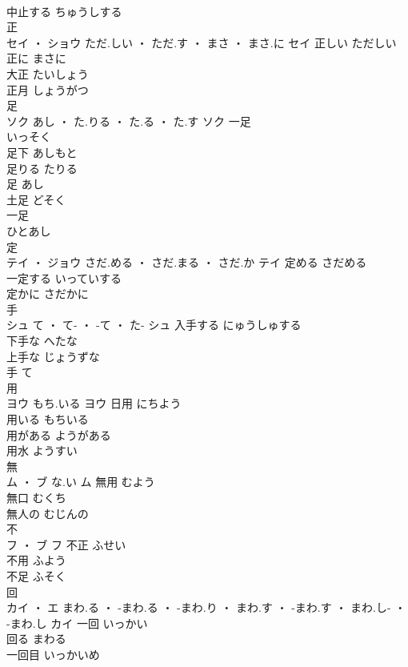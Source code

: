 \documentclass[8pt]{extreport}
\begin{document}
\begin{CJK}{UTF8}{min}
\\	中止する	ちゅうしする	
\\	正	
\\	セイ ・ ショウ	ただ.しい ・ ただ.す ・ まさ ・ まさ.に	セイ	正しい	ただしい	
\\	正に	まさに	
\\	大正	たいしょう	
\\	正月	しょうがつ	
\\	足	
\\	ソク	あし ・ た.りる ・ た.る ・ た.す	ソク	一足 
\\	いっそく	
\\	足下	あしもと	
\\	足りる	たりる	
\\	足	あし	
\\	土足	どそく	
\\	一足 
\\	ひとあし	
\\	定	
\\	テイ ・ ジョウ	さだ.める ・ さだ.まる ・ さだ.か	テイ	定める	さだめる	
\\	一定する	いっていする	
\\	定かに	さだかに	
\\	手	
\\	シュ	て ・ て- ・ -て ・ た-	シュ	入手する	にゅうしゅする	
\\	下手な	へたな	
\\	上手な	じょうずな	
\\	手	て	
\\	用	
\\	ヨウ	もち.いる	ヨウ	日用	にちよう	
\\	用いる	もちいる	
\\	用がある	ようがある	
\\	用水	ようすい	
\\	無	
\\	ム ・ ブ	な.い	ム	無用	むよう	
\\	無口	むくち	
\\	無人の	むじんの	
\\	不	
\\	フ ・ ブ		フ	不正	ふせい	
\\	不用	ふよう	
\\	不足	ふそく	
\\	回	
\\	カイ ・ エ	まわ.る ・ -まわ.る ・ -まわ.り ・ まわ.す ・ -まわ.す ・ まわ.し- ・ -まわ.し	カイ	一回	いっかい	
\\	回る	まわる	
\\	一回目	いっかいめ	

\end{CJK}
\end{document}

